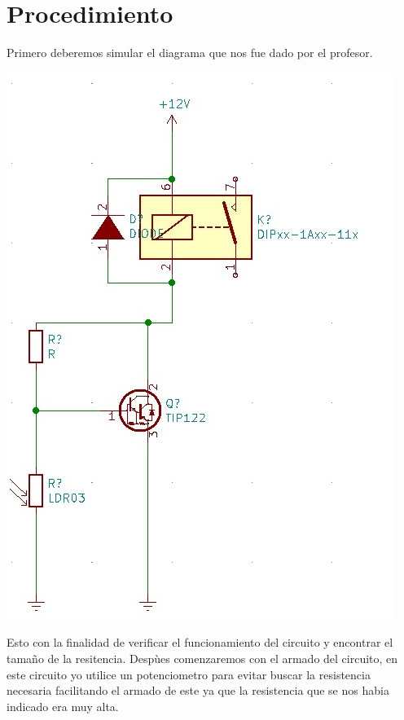 \documentclass[12pt,a4paper]{report}
\begin{document}
\section{Procedimiento}
Primero deberemos simular el diagrama que nos fue dado por el profesor.\\
\begin{center}
\includegraphics[scale=0.5]{02.jpeg}\\
\end{center}
Esto con la finalidad de verificar el funcionamiento del circuito y encontrar el tamaño de la resitencia. Despùes comenzaremos con el armado del circuito, en este circuito yo utilice un potenciometro para evitar buscar la resistencia necesaria facilitando el armado de este ya que la resistencia que se nos habia indicado era muy alta.
\end{document}
